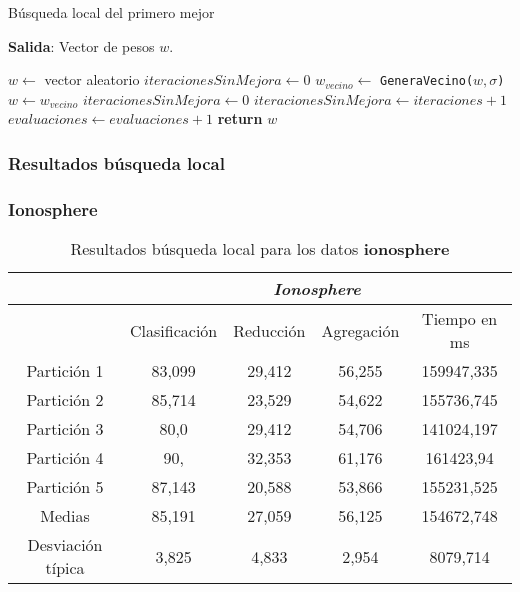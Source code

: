 \begin{algorithm}[H]
  \caption{Búsqueda local del primero mejor}
  
      \hspace*{\algorithmicindent} 
      \textbf{Salida}:
      Vector de pesos $w$.        
  \begin{algorithmic}[1]
        \State $w \gets$ vector aleatorio  
        \State $iteracionesSinMejora \gets 0$ 
      \State $w_{vecino} \gets$ \texttt{GeneraVecino($w,\sigma$)}
        \State $w \gets w_{vecino}$
        \State $iteracionesSinMejora  \gets 0$ 
      \EndIf
      \State $iteracionesSinMejora  \gets iteraciones +1$
      \State $evaluaciones \gets evaluaciones +1$
      \EndWhile
      \State \textbf{return} $w$
    \EndProcedure
  \end{algorithmic}
\end{algorithm}

\subsubsection{Resultados búsqueda local}

\subsubsection*{Ionosphere} 

\begin{table}[H]
  \centering
  \begin{tabular}{|c|c|c|c|c|}
    \hline
    & \multicolumn{4}{|c|}{\textit{Ionosphere}}  \\
    \hline
    &	Clasificación &		Reducción	
    &	Agregación	&	Tiempo en ms \\
    \hline
    Partición 1	& 83,099	 & 29,412	& 56,255 & 159947,335 \\
    Partición 2 &	85,714	 &23,529 &	54,622&	155736,745 \\
    Partición 3 &	80,0 &	29,412&	54,706 & 141024,197 \\
    Partición 4	& 90, & 32,353  & 61,176  & 161423,94 \\
    Partición 5	 &87,143  & 20,588  & 53,866 & 155231,525 \\
    \hline
    Medias 	 & 85,191  & 27,059  & 56,125 & 154672,748 \\
    \hline
    Desviación típica &	3,825 &	4,833& 2,954 &	8079,714 \\ 
    \hline  
  \end{tabular}
  \caption{Resultados búsqueda local para los datos \textbf{ionosphere}}
  \label{table:BL_ionosphere}
\end{table}

